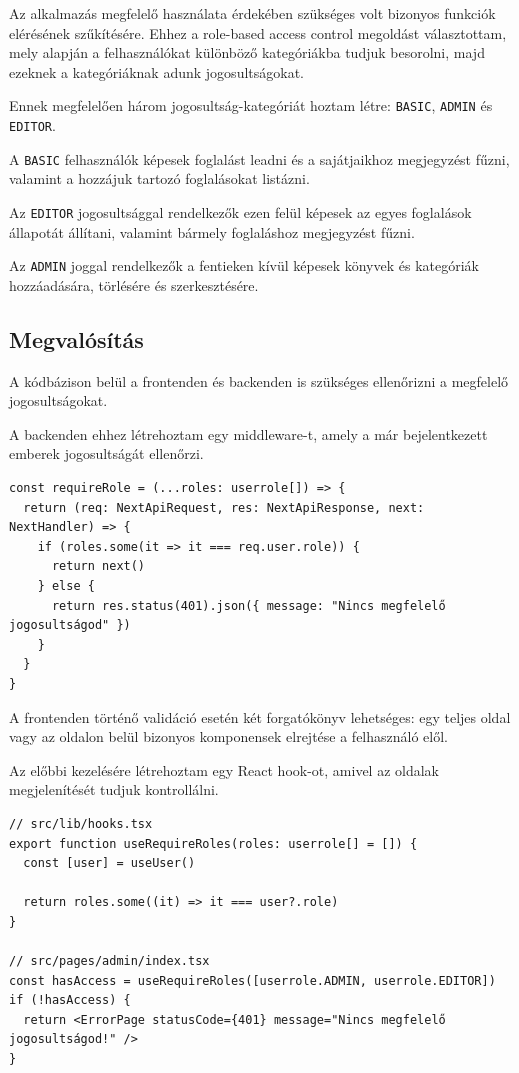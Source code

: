 Az alkalmazás megfelelő használata érdekében szükséges volt bizonyos funkciók elérésének szűkítésére. Ehhez a role-based access control
megoldást választottam, mely alapján a felhasználókat különböző kategóriákba tudjuk besorolni, majd ezeknek a kategóriáknak adunk jogosultságokat.

Ennek megfelelően három jogosultság-kategóriát hoztam létre: \lstinline|BASIC|, \lstinline|ADMIN| és \lstinline|EDITOR|.

A \lstinline|BASIC| felhasználók képesek foglalást leadni és a sajátjaikhoz megjegyzést fűzni, valamint a hozzájuk tartozó foglalásokat listázni.

Az \lstinline|EDITOR| jogosultsággal rendelkezők ezen felül képesek az egyes foglalások állapotát állítani, valamint bármely foglaláshoz
megjegyzést fűzni.

Az \lstinline|ADMIN| joggal rendelkezők a fentieken kívül képesek könyvek és kategóriák hozzáadására, törlésére és szerkesztésére.

\subsection{Megvalósítás}

A kódbázison belül a frontenden és backenden is szükséges ellenőrizni a megfelelő jogosultságokat.

A backenden ehhez létrehoztam egy middleware-t, amely a már bejelentkezett emberek jogosultságát ellenőrzi.
\begin{lstlisting}[caption=Authorizáció middleware]
const requireRole = (...roles: userrole[]) => {
  return (req: NextApiRequest, res: NextApiResponse, next: NextHandler) => {
    if (roles.some(it => it === req.user.role)) {
      return next()
    } else {
      return res.status(401).json({ message: "Nincs megfelelő jogosultságod" })
    }
  }
}
\end{lstlisting}

A frontenden történő validáció esetén két forgatókönyv lehetséges: egy teljes oldal vagy az oldalon belül bizonyos komponensek
elrejtése a felhasználó elől.

Az előbbi kezelésére létrehoztam egy React hook-ot, amivel az oldalak megjelenítését tudjuk kontrollálni.

\begin{lstlisting}[caption=Authorizációs hook és használata]
// src/lib/hooks.tsx
export function useRequireRoles(roles: userrole[] = []) {
  const [user] = useUser()

  return roles.some((it) => it === user?.role)
}

// src/pages/admin/index.tsx
const hasAccess = useRequireRoles([userrole.ADMIN, userrole.EDITOR])
if (!hasAccess) {
  return <ErrorPage statusCode={401} message="Nincs megfelelő jogosultságod!" />
}
\end{lstlisting}

